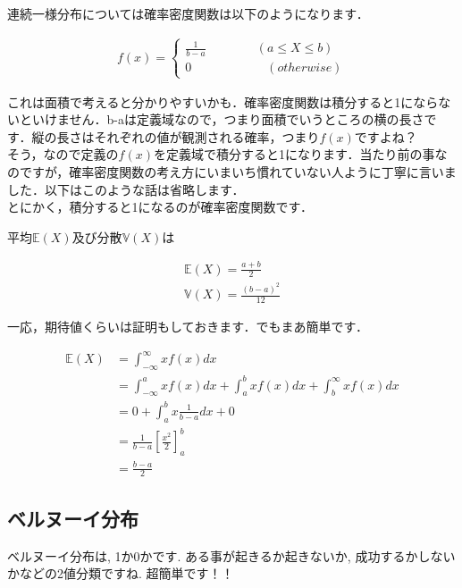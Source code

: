 \documentclass[11pt,a4paper,uplatex]{ujreport} 	%
\begin{document}
連続一様分布については確率密度関数は以下のようになります．

\begin{align}
f(x) = 
\left\{
    \begin{array}{l}
      \frac{1}{b-a} \qquad \qquad  (a \leq X \leq b) \\
      0  \qquad \qquad \qquad(otherwise)
    \end{array}
  \right.
\end{align}

これは面積で考えると分かりやすいかも．確率密度関数は積分すると1にならないといけません．b-aは定義域なので，つまり面積でいうところの横の長さです．縦の長さはそれぞれの値が観測される確率，つまり$f(x)$ですよね？\\

そう，なので定義の$f(x)$を定義域で積分すると1になります．当たり前の事なのですが，確率密度関数の考え方にいまいち慣れていない人ように丁寧に言いました．以下はこのような話は省略します．\\

とにかく，積分すると1になるのが確率密度関数です．


平均$\mathbb{E}(X)$及び分散$\mathbb{V}(X)$は

\begin{align}
\mathbb{E}(X) = \frac{a+b}{2}\\
\mathbb{V}(X) = \frac{(b-a)^2}{12}
\end{align}

一応，期待値くらいは証明もしておきます．でもまあ簡単です．

\begin{align}
\mathbb{E}(X)  &= \int_{-\infty}^{\infty} xf(x) dx \\
&= \int_{-\infty}^{a} xf(x) dx + \int_{a}^{b} xf(x) dx + \int_{b}^{\infty} xf(x) dx \\
&= 0 + \int_{a}^{b} x\frac{1}{b-a} dx + 0\\
&= \frac{1}{b-a}\left[\frac{x^2}{2}\right]_a^b\\
& = \frac{b-a}{2}
\end{align}

\subsection{ベルヌーイ分布}
ベルヌーイ分布は, 1か0かです. ある事が起きるか起きないか, 成功するかしないかなどの2値分類ですね. 超簡単です！！\\
\end{document}
